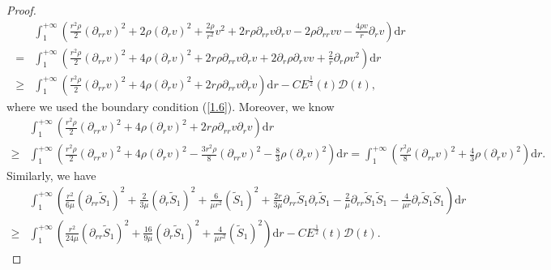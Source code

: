 \documentclass[10pt,reqno]{amsart}
\numberwithin{equation}{section}
\begin{document}
\begin{proof}
\begin{equation}
\begin{aligned}
				&\int_{1}^{+\infty}(\frac{r^2\rho}{2} (\partial_{rr}v)^2+2\rho(\partial_{r}v)^2+\frac{2\rho}{r^2}v^2+2r\rho\partial_{rr}v\partial_{r}v-2\rho\partial_{rr}v v-\frac{4\rho v}{r}\partial_{r}v)\mathrm{d}r\\
				=&\int_{1}^{+\infty}(\frac{r^2\rho}{2} (\partial_{rr}v)^2+4\rho(\partial_{r}v)^2
				+2r\rho\partial_{rr}v\partial_{r}v
				+2\partial_{r}\rho\partial_{r}v v+\frac{2}{r}\partial_{r}\rho v^2)\mathrm{d}r\\
				\geq&\int_{1}^{+\infty}(\frac{r^2\rho}{2} (\partial_{rr}v)^2+4\rho(\partial_{r}v)^2
				+2r\rho\partial_{rr}v\partial_{r}v)\mathrm{d}r-CE^{\frac{1}{2}}(t) \mathcal{D}(t),
			\end{aligned}
		\end{equation}
		where we used the boundary condition (\ref{1.6}). 
		Moreover, we know
		\begin{equation}\nonumber
			\begin{aligned}
				&\int_{1}^{+\infty}(\frac{r^2\rho}{2} (\partial_{rr}v)^2+4\rho(\partial_{r}v)^2
				+2r\rho\partial_{rr}v\partial_{r}v)\mathrm{d}r\\
				\geq&\int_{1}^{+\infty}(\frac{r^2\rho}{2} (\partial_{rr}v)^2+4\rho(\partial_{r}v)^2
				-\frac{3r^2\rho}{8}(\partial_{rr}v)^2-\frac{8}{3}\rho(\partial_{r}v)^2)\mathrm{d}r
				=\int_{1}^{+\infty}(\frac{r^2\rho}{8} (\partial_{rr}v)^2+\frac{4}{3}\rho(\partial_{r}v)^2)\mathrm{d}r.
			\end{aligned}
		\end{equation}
		Similarly, we have 
		\begin{equation}\nonumber
			\begin{aligned}
				&\int_{1}^{+\infty}(\frac{r^2}{6\mu}(\partial_{rr}\tilde{S}_1)^2+\frac{2}{3\mu}(\partial_{r}\tilde{S}_1)^2+\frac{6}{\mu r^2}(\tilde{S}_1)^2 +\frac{2r}{3\mu}\partial_{rr}\tilde{S}_1 \partial_{r}\tilde{S}_1-\frac{2}{\mu}\partial_{rr}\tilde{S}_1\tilde{S}_1-\frac{4}{\mu r}\partial_{r}\tilde{S}_1 \tilde{S}_1)\mathrm{d}r\\
				\geq&\int_{1}^{+\infty}(\frac{r^2}{24\mu}(\partial_{rr}\tilde{S}_1)^2+\frac{16}{9\mu}(\partial_{r}\tilde{S}_1)^2+\frac{4}{\mu r^2}(\tilde{S}_1)^2 
				)\mathrm{d}r-CE^{\frac{1}{2}}(t) \mathcal{D}(t).
			\end{aligned}
		\end{equation}
		

\end{proof}
\end{document}
